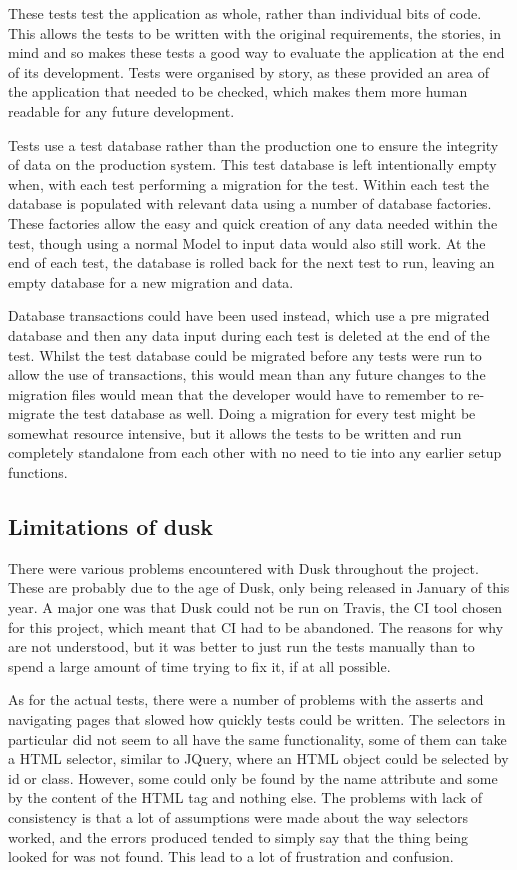 These tests test the application as whole, rather than individual bits of code. This allows the tests to be written with the original requirements, the stories, in mind and so makes these tests a good way to evaluate the application at the end of its development. Tests were organised by story, as these provided an area of the application that needed to be checked, which makes them more human readable for any future development.

Tests use a test database rather than the production one to ensure the integrity of data on the production system. This test database is left intentionally empty when, with each test performing a migration for the test. Within each test the database is populated with relevant data using a number of database factories. These factories allow the easy and quick creation of any data needed within the test, though using a normal Model to input data would also still work. At the end of each test, the database is rolled back for the next test to run, leaving an empty database for a new migration and data.

Database transactions could have been used instead, which use a pre migrated database and then any data input during each test is deleted at the end of the test. Whilst the test database could be migrated before any tests were run to allow the use of transactions, this would mean than any future changes to the migration files would mean that the developer would have to remember to re-migrate the test database as well. Doing a migration for every test might be somewhat resource intensive, but it allows the tests to be written and run completely standalone from each other with no need to tie into any earlier setup functions. 

\subsection{Limitations of dusk}
There were various problems encountered with Dusk throughout the project. These are probably due to the age of Dusk, only being released in January of this year. A major one was that Dusk could not be run on Travis, the CI tool chosen for this project, which meant that CI had to be abandoned. The reasons for why are not understood, but it was better to just run the tests manually than to spend a large amount of time trying to fix it, if at all possible.

As for the actual tests, there were a number of problems with the asserts and navigating pages that slowed how quickly tests could be written. The selectors in particular did not seem to all have the same functionality, some of them can take a HTML selector, similar to JQuery, where an HTML object could be selected by id or class. However, some could only be found by the name attribute and some by the content of the HTML tag and nothing else. The problems with lack of consistency is that a lot of assumptions were made about the way selectors worked, and the errors produced tended to simply say that the thing being looked for was not found. This lead to a lot of frustration and confusion. 

